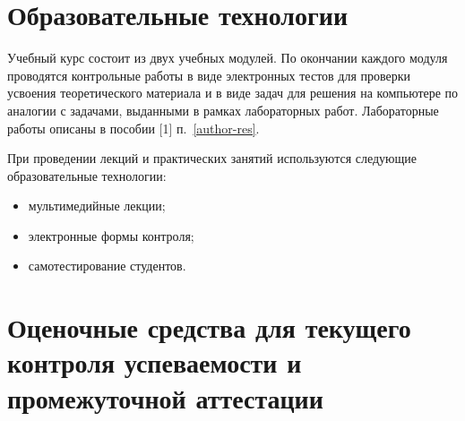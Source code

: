 \printhours



\section{Образовательные технологии}

Учебный курс состоит из двух учебных модулей. По окончании каждого модуля проводятся контрольные работы в виде электронных тестов для проверки усвоения теоретического материала и в виде задач для решения на компьютере по аналогии с задачами, выданными в рамках лабораторных работ. Лабораторные работы описаны в пособии [1] п.~\ref{author-res}.

При проведении лекций и практических занятий используются следующие образовательные технологии:
\begin{itemize}
	\item мультимедийные лекции;
	\item электронные формы контроля;
	\item самотестирование студентов.
\end{itemize}

\section{Оценочные средства для текущего контроля успеваемости и промежуточной аттестации}


